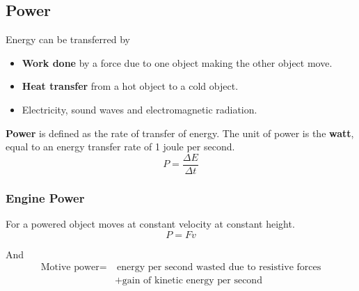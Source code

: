 \subsection{Power}

Energy can be transferred by
\begin{itemize}
    \item \textbf{Work done} by a force due to one object making the other object move.
    \item \textbf{Heat transfer} from a hot object to a cold object.
    \item Electricity, sound waves and electromagnetic radiation.
\end{itemize}

\textbf{Power} is defined as the rate of transfer of energy. The unit of power is the \textbf{watt}, equal to an energy transfer rate of 1 joule per second.
$$P=\frac{\Delta E}{\Delta t}$$

\subsubsection*{Engine Power}

For a powered object moves at constant velocity at constant height.
$$P=Fv$$

And
\begin{align*}
    \text{Motive power}=&\ \text{energy per second wasted due to resistive forces}\\
                        &+\text{gain of kinetic energy per second}
\end{align*}
